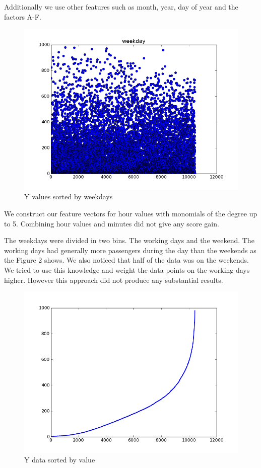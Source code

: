 \documentclass[a4paper, 11pt]{article}
\begin{document}
Additionally we use other features such as month, year, day of year and the factors A-F.


\begin{figure}
\includegraphics[width=0.9\linewidth]{Plots/weekdays} 
\caption{Y values sorted by weekdays}
\end{figure} We construct our feature vectors for hour values with monomials of the degree up to 5. Combining hour values and minutes did not give any score gain.

The weekdays were divided in two bins. The working days and the weekend. The working days had generally more passengers during the day than the weekends as the Figure 2 shows. We also noticed that half of the data was on the weekends. We tried to use this knowledge and weight the data points on the working days higher. However this approach did not produce any substantial results. 
\clearpage

\begin{figure}
\includegraphics[width=0.9\linewidth]{Plots/data_sorted} 
\caption{Y data sorted by value}
\end{figure}
 
\end{document}
